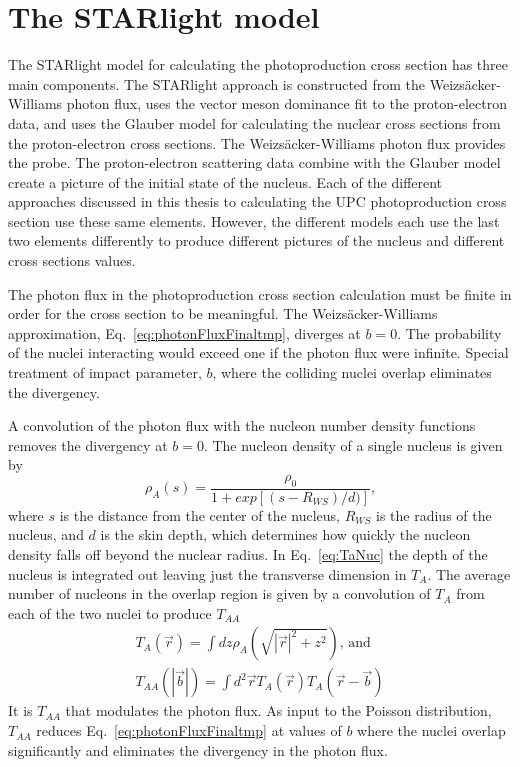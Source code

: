  \section{\label{sec:vdmTheory}The STARlight model}
    The STARlight model for calculating the \JPsi{}
      photoproduction cross section has three main components.
    The STARlight approach is constructed from the Weizs\"{a}cker-Williams 
      photon flux, uses the vector meson dominance fit to the proton-electron data, 
      and uses the Glauber model for calculating the nuclear cross sections from 
      the proton-electron cross sections.
    The Weizs\"{a}cker-Williams photon flux provides the probe. 
    The proton-electron scattering data combine with the Glauber model  
      create a picture of the initial state of the nucleus. 
    Each of the different approaches discussed in this thesis to calculating 
      the UPC \JPsi{}  photoproduction cross section use these same elements.
    However, the different models each use the last two elements differently 
      to produce different pictures of the nucleus and different cross 
      sections values. 

    The photon flux in the photoproduction cross section calculation must be 
      finite in order for the cross section to be meaningful.
    The Weizs\"{a}cker-Williams approximation, Eq.~\ref{eq:photonFluxFinaltmp}, 
      diverges at $b=0$.
    The probability of the nuclei interacting would exceed one if the photon 
      flux were infinite. 
    Special treatment of impact parameter, $b$, where the colliding nuclei 
      overlap eliminates the divergency. 
    
    A convolution of the photon flux with the nucleon number density functions 
      removes the divergency at $b=0$. 
    The nucleon density of a single nucleus is given by
    \begin{equation} 
      \rho_{A}(s)=\frac{\rho_{0}}{1+exp[(s-R_{WS})/d)]}\textrm{,}
      \label{eq:woodsSaxon}
    \end{equation}
    where $s$ is the distance from the center of the 
      nucleus, $R_{WS}$ is the radius of the nucleus, and $d$ is the skin depth, 
      which determines how quickly the nucleon density falls off beyond the 
      nuclear radius. 
    In Eq.~\ref{eq:TaNuc} the depth of the nucleus is integrated out leaving
      just the transverse dimension in $T_{A}$.
    The average number of nucleons in the overlap region is given by a 
      convolution of $T_A$ from each of the two nuclei to produce $T_{AA}$
    \begin{eqnarray} \label{eq:TaNuc}
      T_{A}(\vec{r})=\int{dz\rho_{A}(\sqrt{|\vec{r}|^{2}+z^{2}})}\textrm{, and} \nonumber \\ 
      T_{AA}(|\vec{b}|)=\int{d^{2}\vec{r}T_{A}(\vec{r})T_{A}(\vec{r}-\vec{b})}
    \end{eqnarray}
    It is $T_{AA}$ that modulates the photon flux. 
    As input to the Poisson distribution, $T_{AA}$ reduces 
      Eq.~\ref{eq:photonFluxFinaltmp} at values of $b$ where the nuclei overlap 
      significantly and eliminates the divergency in the photon flux. 
    
